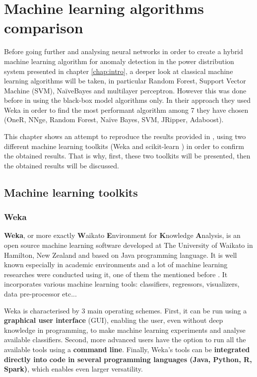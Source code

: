 \chapter{Machine learning algorithms comparison} \label{chap:methods}


Before going further and analysing neural networks in order to create a hybrid machine learning algorithm for anomaly detection in the power distribution system presented in chapter \ref{chap:intro}, a deeper look at classical machine learning algorithms will be taken, in particular Random Forest, Support Vector Machine (SVM), NaïveBayes and multilayer perceptron. However this was done before in \cite{borges_hink_machine_2014-1} using the black-box model algorithms only. In their approach they used Weka \cite{witten_appendix_2017} in order to find the most performant algorithm among 7 they have chosen (OneR, NNge, Random Forest, Naïve Bayes, SVM, JRipper, Adaboost). 

This chapter shows an attempt to reproduce the results provided in \cite{borges_hink_machine_2014-1}, using two different machine learning toolkits (Weka and scikit-learn \cite{pedregosa_scikit-learn_2011}) in order to confirm the obtained results. That is why, first, these two toolkits will be presented, then the obtained results will be discussed.  

\section{Machine learning toolkits}
\subsection{Weka} \label{sec:weka_in_chap:methods}
\textbf{Weka}, or more exactly \textbf{W}aikato \textbf{E}nvironment for \textbf{K}nowledge \textbf{A}nalysis, is an open source machine learning software developed at The University of Waikato in Hamilton, New Zealand and based on Java programming language. It is well known especially in academic environments and a lot of machine learning researches were conducted using it, one of them the mentioned before \cite{borges_hink_machine_2014-1}. It incorporates various machine learning tools: classifiers, regressors, visualizers, data pre-processor etc...

Weka is characterised by 3 main operating schemes. First, it can be run using a \textbf{graphical user interface} (GUI), enabling the user, even without deep knowledge in programming, to make machine learning experiments and analyse available classifiers. Second, more advanced users have the option to run all the available tools using a \textbf{command line}. Finally, Weka's tools can be \textbf{integrated directly into code in several programming languages (Java, Python, R, Spark)}, which enables even larger versatility.

